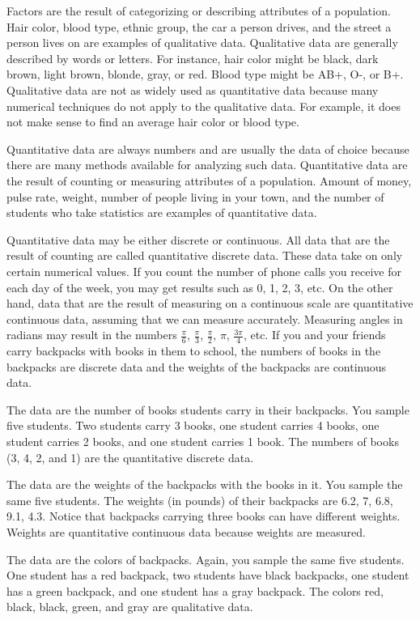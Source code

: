 \documentclass[]{krantz}
\theoremstyle{definition}
\theoremstyle{definition}
\theoremstyle{definition}
\theoremstyle{remark}
\begin{document}
Factors are the result of categorizing or describing attributes of a
population. Hair color, blood type, ethnic group, the car a person
drives, and the street a person lives on are examples of qualitative
data. Qualitative data are generally described by words or letters. For
instance, hair color might be black, dark brown, light brown, blonde,
gray, or red. Blood type might be AB+, O-, or B+. Qualitative data are
not as widely used as quantitative data because many numerical
techniques do not apply to the qualitative data. For example, it does
not make sense to find an average hair color or blood type.

Quantitative data are always numbers and are usually the data of choice
because there are many methods available for analyzing such data.
Quantitative data are the result of counting or measuring attributes of
a population. Amount of money, pulse rate, weight, number of people
living in your town, and the number of students who take statistics are
examples of quantitative data.

Quantitative data may be either discrete or continuous. All data that
are the result of counting are called quantitative discrete data. These
data take on only certain numerical values. If you count the number of
phone calls you receive for each day of the week, you may get results
such as 0, 1, 2, 3, etc. On the other hand, data that are the result of
measuring on a continuous scale are quantitative continuous data,
assuming that we can measure accurately. Measuring angles in radians may
result in the numbers \(\frac{\pi}{6}\), \(\frac{\pi}{3}\), \(\frac{\pi}{2}\),
\(\pi\), \(\frac{3\pi}{4}\), etc. If you and your friends carry backpacks
with books in them to school, the numbers of books in the backpacks are
discrete data and the weights of the backpacks are continuous data.

The data are the number of books students carry in their backpacks. You
sample five students. Two students carry 3 books, one student carries 4
books, one student carries 2 books, and one student carries 1 book. The
numbers of books (3, 4, 2, and 1) are the quantitative discrete data.

The data are the weights of the backpacks with the books in it. You
sample the same five students. The weights (in pounds) of their
backpacks are 6.2, 7, 6.8, 9.1, 4.3. Notice that backpacks carrying
three books can have different weights. Weights are quantitative
continuous data because weights are measured.

The data are the colors of backpacks. Again, you sample the same five
students. One student has a red backpack, two students have black
backpacks, one student has a green backpack, and one student has a gray
backpack. The colors red, black, black, green, and gray are qualitative
data.
\end{document}
